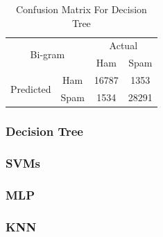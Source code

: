 \documentclass[12pt]{article}
\begin{document}
\begin{table}[H]
\begin{floatrow}
{\begin{subtable}{.5\textwidth}
								\begin{tabular}{@{}|c|c|c|c|@{}}
										\toprule
										\multicolumn{2}{|c|}{\multirow{2}{*}{Bi-gram}} & \multicolumn{2}{c|}{Actual} \\ \cmidrule(l){3-4} 
										\multicolumn{2}{|c|}{}                        & Ham          & Spam         \\ \midrule
										\multirow{2}{*}{Predicted}       & Ham        & 16787        & 1353         \\ \cmidrule(l){2-4} 
										& Spam       & 1534         & 28291        \\ \bottomrule
									\end{tabular}
							\end{subtable}
					}{  
						\caption{Confusion Matrix For Decision Tree}  
						\label{Confusion_DT}  
					}  
			\end{floatrow}
	\end{table} 


\subsubsection{Decision Tree}




\subsubsection{SVMs}


\subsubsection{MLP}



\subsubsection{KNN}

\end{document}
